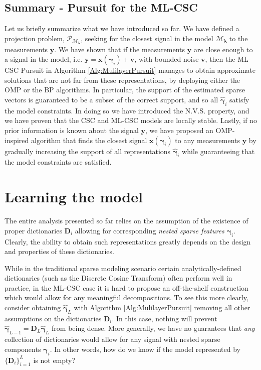 \documentclass[10pt,journal]{IEEEtran}
\def\x{{\mathbf x}}
\def\v{{\mathbf v}}
\def\y{{\mathbf y}}
\def\D{{\mathbf D}}
\def\M{{\mathcal{M}}}
\def\P{{\mathcal{P}}}
\def\gama{{\boldsymbol \gamma}}
\def\lamda{{\boldsymbol \lambda}}
\def\PM{{\P_{\M_\lamda}}}
\theoremstyle{plain}
\theoremstyle{definition}
\begin{document}
\subsection{Summary - Pursuit for the ML-CSC}

Let us briefly summarize what we have introduced so far. We have defined a projection problem, $\PM$, seeking for the closest signal in the model $\M_\lamda$ to the measurements $\y$. We have shown that if the measurements $\y$ are close enough to a signal in the model, i.e. $\y = \x(\gama_i) + \v$, with bounded noise $\v$, then the ML-CSC Pursuit in Algorithm \ref{Alg:MulilayerPursuit} manages to obtain approximate solutions that are not far from these representations, by deploying either the OMP or the BP algorithms. In particular, the support of the estimated sparse vectors is guaranteed to be a subset of the correct support, and so all $\hat{\gama}_i$ satisfy the model constraints. In doing so we have introduced the N.V.S. property, and we have proven that the CSC and ML-CSC models are locally stable. Lastly, if no prior information is known about the signal $\y$, we have proposed an OMP-inspired algorithm that finds the closest signal $\x(\gama_i)$ to any measurements $\y$ by gradually increasing the support of all representations $\hat{\gama}_i$ while guaranteeing that the model constraints are satisfied. %










\section{Learning the model}
\label{sec:Learning}
\label{sec:empty_models?}
The entire analysis presented so far relies on the assumption of the existence of proper dictionaries $\D_i$ allowing for corresponding \emph{nested sparse features} $\gama_i$. Clearly, the ability to obtain such representations greatly depends on the design and properties of these dictionaries. 

While in the traditional sparse modeling scenario certain analytically-defined dictionaries (such as the Discrete Cosine Transform) often perform well in practice, in the ML-CSC case it is hard to propose an off-the-shelf construction which would allow for any meaningful decompositions. To see this more clearly, consider obtaining $\hat{\gama}_L$ with Algorithm \ref{Alg:MulilayerPursuit} removing all other assumptions on the dictionaries $\D_i$. In this case, nothing will prevent $\hat{\gama}_{L-1} = \D_L\hat{\gama}_L$ from being dense. More generally, we have no guarantees that \emph{any} collection of dictionaries would allow for any signal with nested sparse components $\gama_i$. In other words, how do we know if the model represented by $\{\D_i\}_{i=1}^L$ is not empty?
\end{document}
